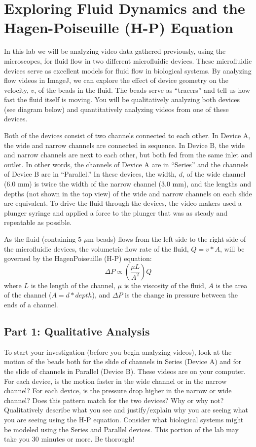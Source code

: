 \chapter{Exploring Fluid Dynamics and the Hagen-Poiseuille (H-P) Equation}
\thispagestyle{fancy}
%
In this lab we will be analyzing video data gathered previously, using the microscopes, for
fluid flow in two different microfluidic devices.
These microfluidic devices serve as excellent models for fluid flow in biological systems.
By analyzing flow videos in ImageJ, we can explore the effect of device geometry on the velocity, $v$, of the beads in the fluid.
The beads serve as ``tracers'' and tell us how fast the fluid itself is moving.
You will be qualitatively analyzing both devices (see diagram below) and quantitatively analyzing videos from one of these devices.
\par
Both of the devices consist of two channels connected to each other.
In Device A, the wide and narrow channels are connected in sequence.
In Device B, the wide and narrow channels are next to each other, but both fed from the same inlet and outlet.
In other words, the channels of Device A are in ``Series'' and the channels of Device B are in ``Parallel.''
In these devices, the width, $d$, of the wide channel (6.0 mm) is twice the width of the narrow channel (3.0 mm), and the lengths and depths (not shown in the top view) of the wide and narrow channels on each slide are equivalent.
To drive the fluid through the devices, the video makers used a plunger syringe and applied a force to the plunger that was as steady and repeatable as possible.
\par
As the fluid (containing 5 $\mu$m beads) flows from the left side to the right side of the
microfluidic devices, the volumetric flow rate of the fluid, $Q = v*A$, will be governed by the HagenPoiseuille (H-P) equation:
\[ \Delta P \propto \left( \frac{\mu L}{A^{2}} \right) Q \]
where $L$ is the length of the channel, $\mu$ is the viscosity of the fluid, $A$ is the area of the channel ($A = d*depth$), and $\Delta P$ is the change in pressure between the ends of a channel.

\section*{Part 1: Qualitative Analysis}
To start your investigation (before you begin analyzing videos), look at the motion of the
beads both for the slide of channels in Series (Device A) and for the slide of channels in Parallel (Device B).
These videos are on your computer.
For each device, is the motion faster in the wide channel or in the narrow channel?
For each device, is the pressure drop higher in the narrow or wide channel?
Does this pattern match for the two devices?
Why or why not?
Qualitatively describe what you see and justify/explain why you are seeing what you are seeing using the H-P equation.
Consider what biological systems might be modeled using the Series and Parallel devices.
This portion of the lab may take you 30 minutes or more.
Be thorough!

